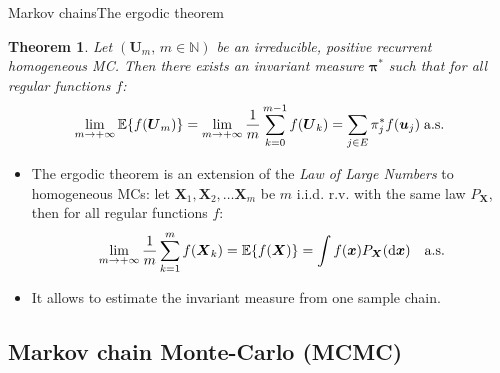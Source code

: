 \documentclass{beamer}
\newcommand{\Nset}{\mathbb{N}}
\newcommand{\id}{\mathrm{d}}
\newcommand{\xgj}{x}
\newcommand{\ugj}{u}
\newcommand{\xg}{{\boldsymbol\xgj}}
\newcommand{\ug}{{\boldsymbol\ugj}}
\newcommand{\esp}[1]{\mathbb{E}\{\smash{#1}\}}
\newcommand{\Ugj}{U}
\newcommand{\Xgj}{X}
\newcommand{\Ug}{{\boldsymbol\Ugj}}
\newcommand{\Xg}{{\boldsymbol\Xgj}}
\newcommand{\TKij}{\pi}
\newcommand{\TKi}{{\boldsymbol\pi}}
\newcommand{\SMi}{\TKij^*}
\newcommand{\SM}{\TKi^*}
\newtheorem{mythe}{Theorem}
\begin{document}
\begin{frame}{Markov chains}{The ergodic theorem}

\begin{mythe}
Let $(\Ug_m,\,m\in\Nset)$ be an irreducible, positive recurrent homogeneous MC. Then there exists an invariant measure $\SM$ such that for all regular functions $f$:
\begin{displaymath}
\lim_{m\rightarrow+\infty}\esp{f(\Ug_m)}=\lim_{m\rightarrow+\infty}\frac{1}{m}\sum_{k=0}^{m-1}f(\Ug_k)=\sum_{j\in E}\SMi_jf(\ug_j)\;\text{a.s.}
\end{displaymath}
\end{mythe}
\footnotesize{
\begin{itemize}
\item The ergodic theorem is an extension of the \emph{Law of Large Numbers} to homogeneous MCs: let $\Xg_1,\Xg_2,\dots\Xg_m$ be $m$ i.i.d. r.v. with the same law $P_\Xg$, then for all regular functions $f$:
\begin{displaymath}
\lim_{m\rightarrow+\infty}\frac{1}{m}\sum_{k=1}^mf(\Xg_k)=\esp{f(\Xg)}=\int f(\xg)P_\Xg(\id\xg)\quad\text{a.s.}
\end{displaymath}
\item It allows to estimate the invariant measure from one sample chain.
\end{itemize}}
\end{frame}

\subsection{Markov chain Monte-Carlo (MCMC)}
\end{document}
